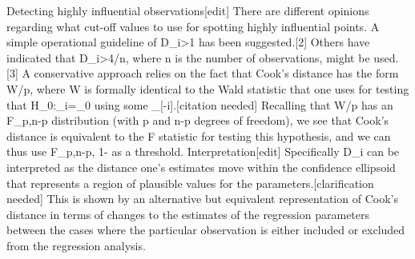 Detecting highly influential observations[edit]
There are different opinions regarding what cut-off values to use for spotting highly influential points. A simple operational guideline of D_i>1 has been suggested.[2] Others have indicated that D_i>4/n, where n is the number of observations, might be used.[3]
A conservative approach relies on the fact that Cook's distance has the form W/p, where W is formally identical to the Wald statistic that one uses for testing that H_0:\beta_i=\beta_0 using some \hat{\beta}_{[-i]}.[citation needed] Recalling that W/p has an F_{p,n-p} distribution (with p and n-p degrees of freedom), we see that Cook's distance is equivalent to the F statistic for testing this hypothesis, and we can thus use F_{p,n-p, 1-\alpha} as a threshold.
Interpretation[edit]
Specifically D_i can be interpreted as the distance one's estimates move within the confidence ellipsoid that represents a region of plausible values for the parameters.[clarification needed] This is shown by an alternative but equivalent representation of Cook's distance in terms of changes to the estimates of the regression parameters between the cases where the particular observation is either included or excluded from the regression analysis.
